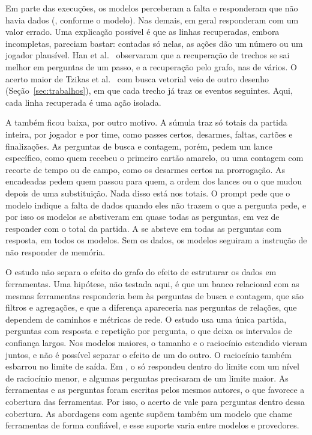 Em parte das execuções, os modelos perceberam a falta e responderam que não havia dados (\abstRangeVector{},
conforme o modelo). Nas demais, em geral responderam com um valor errado. Uma explicação possível é que as linhas
recuperadas, embora incompletas, pareciam bastar: contadas só nelas, as ações dão um número ou um jogador
plausível. Han et al.~\cite{han2025ragvsgraphrag} observaram que a recuperação de trechos se sai melhor em
perguntas de um passo, e a recuperação pelo grafo, nas de vários. O acerto maior de Tzikas et
al.~\cite{tzikas2025dynamic} com busca vetorial veio de outro desenho (Seção~\ref{sec:trabalhos}), em que cada
trecho já traz os eventos seguintes. Aqui, cada linha recuperada é uma ação isolada.

A \armStatsInPrompt{} também ficou baixa, por outro motivo. A súmula traz só totais da partida inteira, por jogador
e por time, como passes certos, desarmes, faltas, cartões e finalizações. As perguntas de busca e contagem, porém,
pedem um lance específico, como quem recebeu o primeiro cartão amarelo, ou uma contagem com recorte de tempo ou de
campo, como os desarmes certos na prorrogação. As encadeadas pedem quem passou para quem, a ordem dos lances ou o
que mudou depois de uma substituição. Nada disso está nos totais. O prompt pede que o modelo indique a falta de
dados quando eles não trazem o que a pergunta pede, e por isso os modelos se abstiveram em quase todas as
perguntas, em vez de responder com o total da partida. A \armNoContext{} se absteve em todas as perguntas com
resposta, em todos os modelos. Sem os dados, os modelos seguiram a instrução de não responder de memória.

O estudo não separa o efeito do grafo do efeito de estruturar os dados em ferramentas. Uma hipótese, não testada
aqui, é que um banco relacional com as mesmas ferramentas responderia bem às perguntas de busca e contagem, que são
filtros e agregações, e que a diferença apareceria nas perguntas de relações, que dependem de caminhos e métricas
de rede. O estudo usa uma única partida, \nAnswerable{} perguntas com resposta e \nRepeats{} repetição por
pergunta, o que deixa os intervalos de confiança largos. Nos modelos maiores, o tamanho e o raciocínio estendido
vieram juntos, e não é possível separar o efeito de um do outro. O raciocínio também esbarrou no limite de saída.
Em \armEventsInPrompt{}, o \modelSonnet{} só respondeu dentro do limite com um nível de raciocínio menor, e algumas
perguntas precisaram de um limite maior. As ferramentas e as perguntas foram escritas pelos mesmos autores, o que
favorece a cobertura das ferramentas. Por isso, o acerto de \armGraphTools{} vale para perguntas dentro dessa
cobertura. As abordagens com agente supõem também um modelo que chame ferramentas de forma confiável, e esse
suporte varia entre modelos e provedores.
